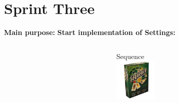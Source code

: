 \section{Sprint Three}
\begin{frame}
\textbf{Main purpose:}
\textbf{Start implementation of Settings:}\\
\begin{columns}
\begin{column}{0.5\textwidth}

          \begin{center}
        \end{center}
        \begin{center}
        \end{center}
\end{column}
\begin{column}{0.5\textwidth}
        \begin{center}
         \end{center}
        \begin{center}
                     {Sequence\\
                     \includegraphics[height=2cm]{images/sequence}}
        \end{center}
\end{column}
\end{columns}
\end{frame}

